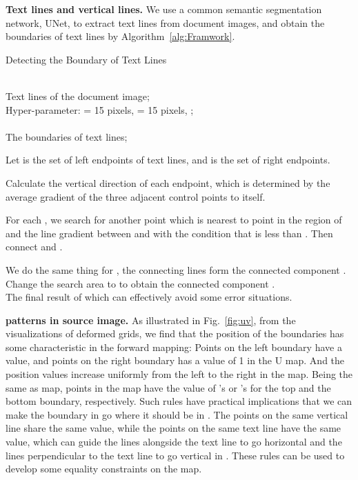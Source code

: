 \documentclass[10pt,twocolumn,letterpaper]{article}
\newcommand{\myparagraph}[1]{\vspace{1pt} \noindent \textbf{#1} }
\begin{document}
\myparagraph{Text lines and vertical lines.} We use a common semantic segmentation network, \ie UNet, to extract text lines from document images, and obtain the boundaries of text lines by Algorithm~\ref{alg:Framwork}.
\vspace{-1em}
\begin{algorithm}[!htb] 
\renewcommand{\algorithmicrequire}{\textbf{Input:}}
\renewcommand{\algorithmicensure}{\textbf{Output:}}
\caption{Detecting the Boundary of Text Lines} 
\label{alg:Framwork} 
\begin{algorithmic}[1] \REQUIRE ~~\\ Text lines of the document image;\\
Hyper-parameter:  = 15 pixels,  = 15 pixels, ;\\
\ENSURE ~~\\ The boundaries of text lines;


\STATE Let  is the set of left endpoints  of text lines,  and  is the set of right endpoints.  

\STATE Calculate the vertical direction  of each endpoint, which is determined by the average gradient of the three adjacent control points to itself. 

\STATE For each , we search for another point  which is nearest to point  in the region of  and the line gradient between  and  with the condition that  is less than . Then connect  and . 

\STATE We do the same thing for , the connecting lines form the connected component . \\

\STATE Change the search area to  to obtain the connected component . \\ 
\STATE The final result of  which can effectively avoid some error situations.  
\end{algorithmic}
\end{algorithm}

\myparagraph{ patterns in source image.} As illustrated in Fig.~\ref{fig:uv}, from the visualizations of deformed grids, we find that the position of the boundaries has some characteristic in the forward mapping: Points on the left boundary have a  value, and points on the right boundary has a value of 1 in the U map. And the position values increase uniformly from the left to the right in the  map. Being the same as  map, points in the 
 map have the value of 's or 's for the top and the bottom boundary, respectively. Such rules have practical implications that we can make the boundary in  go where it should be in .
The points on the same vertical line share the same  value, while the points on the same text line have the same  value, which can guide the lines alongside the text line to go horizontal and the lines perpendicular to the text line to go vertical in .
These rules can be used to develop some equality constraints on the  map.
\end{document}
